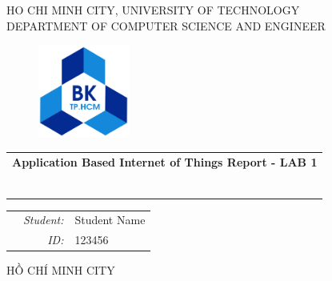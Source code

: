 \documentclass[a4paper,11pt]{article}
\theoremstyle{mytheor}
\begin{document}
\begin{titlepage}
\begin{center}
HO CHI MINH CITY, UNIVERSITY OF TECHNOLOGY \\
DEPARTMENT OF COMPUTER SCIENCE AND ENGINEER
\end{center}

\vspace{1cm}

\begin{figure}[h!]
\begin{center}
\includegraphics[width=3cm]{hcmut.png}
\end{center}
\end{figure}

\vspace{2cm}


\begin{center}
\begin{tabular}{c}
\multicolumn{1}{c}{\textbf{{\Large Application Based Internet of Things Report - LAB 1}}}



~~\\

\\
\multicolumn{1}{l}{\textbf{{\Large}}}\\
\\
\textbf{{\Large}}\\

\\
\\

\end{tabular}
\end{center}

\vspace{3cm}

\begin{table}[h]
\begin{tabular}{rrl}
\hspace{5.1cm} 
&\textit{Student: } & Student Name\\
&\textit{ID: } & 123456 \\

\end{tabular}
\end{table}
\vspace{3cm}
\begin{center}
{\footnotesize HỒ CHÍ MINH CITY}
\end{center}
\end{titlepage}
\end{document}
